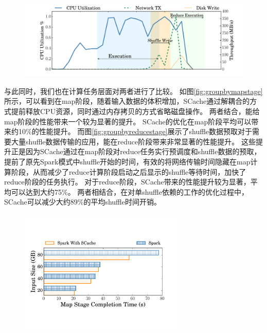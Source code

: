 \begin{figure}[!htp]
	\centering
	\includegraphics[width=\textwidth]{../../PPoPP-2018/fig/scache_util.pdf}
\end{figure}

与此同时，我们也在计算任务层面对两者进行了比较。
如图\ref{fig:groupbymapstage}所示，可以看到在map阶段，随着输入数据的体积增加，SCache通过解耦合的方式提前释放CPU资源，同时通过内存拷贝的方式省略磁盘操作。
两者结合，能给map阶段的性能带来一个较为显著的提升。
SCache的优化在map阶段平均可以带来约10\%的性能提升。
而图\ref{fig:groupbyreducestage}展示了shuffle数据预取对于需要大量shuffle数据传输的应用，能在reduce阶段带来非常显著的性能提升。
这些提升正是因为SCache通过在map阶段对reduce任务实行预调度和shuffle数据的预取，提前了原先Spark模式中shuffle开始的时间，有效的将网络传输时间隐藏在map计算阶段，从而减少了reduce计算阶段启动之后显示的shuffle等待时间，加快了reduce阶段的任务执行。
对于reduce阶段，SCache带来的性能提升较为显著，平均可以达到大约75\%。
两者相结合，在对单shuffle依赖的工作的优化过程中，SCache可以减少大约89\%的平均shuffle时间开销。

\begin{figure}[!htp]
	\centering
	\includegraphics[width=0.7\textwidth]{../../PPoPP-2018/fig/groupbymapstage.pdf}
\end{figure}

